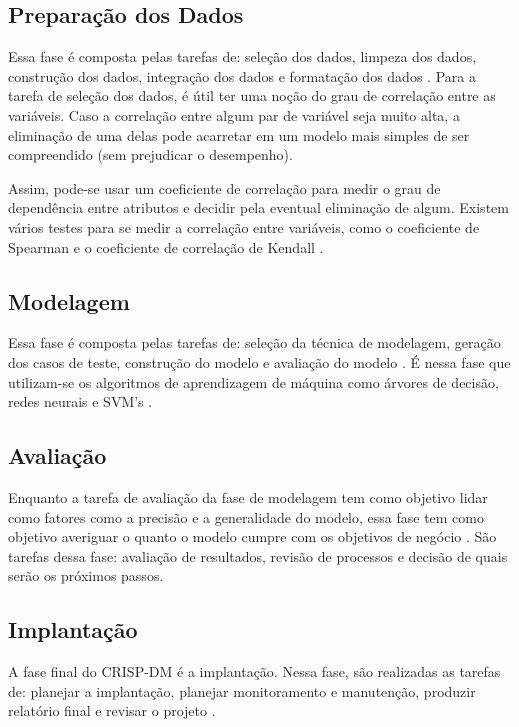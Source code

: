 \subsection{Preparação dos Dados}
Essa fase é composta pelas tarefas de: seleção dos dados, limpeza dos dados, construção
dos dados, integração dos dados e formatação dos dados \cite{crispdm}. Para a tarefa
de seleção dos dados, é útil ter uma noção do grau de correlação entre as variáveis. 
Caso a correlação entre algum par de variável seja muito alta, a eliminação de uma
delas pode acarretar em um modelo mais simples de ser compreendido (sem prejudicar o
desempenho).
\par Assim, pode-se usar um coeficiente de correlação para medir o grau de dependência
entre atributos e decidir pela eventual eliminação de algum. Existem vários testes
para se medir a correlação entre variáveis, como o coeficiente de Spearman e o
coeficiente de correlação de Kendall \cite{kendall}. 

\subsection{Modelagem} 
Essa fase é composta pelas tarefas de: seleção da técnica de modelagem, geração dos
casos de teste, construção do modelo e avaliação do modelo \cite{crispdm}. É nessa
fase que utilizam-se os algoritmos de aprendizagem de máquina como árvores de decisão,
redes neurais e SVM's \cite{ml_second_book}. 

\subsection{Avaliação} 
Enquanto a tarefa de avaliação da fase de modelagem tem como objetivo lidar como
fatores como a precisão e a generalidade do modelo, essa fase tem como objetivo
averiguar o quanto o modelo cumpre com os objetivos de negócio \cite{crispdm}. São
tarefas dessa fase: avaliação de resultados, revisão de processos e decisão de quais
serão os próximos passos. 

\subsection{Implantação} 
A fase final do CRISP-DM é a implantação. Nessa fase, são realizadas as tarefas de:
planejar a implantação, planejar monitoramento e manutenção, produzir relatório final
e revisar o projeto \cite{crispdm}.

